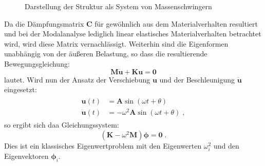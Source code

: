 \documentclass[letterpaper,10pt,german]{jupyterBook}
\let\sphinxpxdimen\pdfpxdimen\else\newdimen\sphinxpxdimen
\begin{document}
\begin{figure}[htbp]
\centering
\capstart

\noindent\sphinxincludegraphics[width=500\sphinxpxdimen]{{Modal_Ansys_01}.png}
\caption{Darstellung der Struktur als System von Massenschwingern }\label{\detokenize{chapters/chapter6/Modalanalyse:modalansys01}}\end{figure}

\sphinxAtStartPar
Da die Dämpfungsmatrix \(\mathbf{C}\) für gewöhnlich aus dem Materialverhalten resultiert und bei der Modalanalyse lediglich linear elastisches Materialverhalten betrachtet wird, wird diese Matrix   vernachlässigt. Weiterhin sind die Eigenformen unabhängig von der äußeren Belastung, so dass die resultierende Bewegungsgleichung:
\label{equation:chapters/chapter6/Modalanalyse:acb03aee-8ea8-4cf6-8dad-f894d0eed7ea}\begin{equation}
\bm{M}\ddot{\bm{u}} + \bm{K}\bm{u} = \bm{0}
\end{equation}
\sphinxAtStartPar
lautet. Wird nun der Ansatz der Verschiebung \(\bm{u}\) und der Beschleunigung \(\ddot{\bm{u}}\) eingesetzt:
\begin{equation}\label{equation:chapters/chapter6/Modalanalyse:FEMLinearDynamics}
\begin{split}\begin{align}
 \bm{u}(t) & = \bm{A} \sin\left(\omega t + \theta\right) \\
 \ddot{\bm{u}}(t) & = -\omega^2 \bm{A} \sin\left(\omega t + \theta\right) \; ,
\end{align}\end{split}
\end{equation}
\sphinxAtStartPar
so ergibt sich daa Gleichungssystem:
\label{equation:chapters/chapter6/Modalanalyse:757f4976-e9fc-49e3-ad1b-356668770916}\begin{equation}
\left( \bm{K} - \omega^2 \bm{M} \right) \bm{\phi} = \bm{0} \; .
\end{equation}
\sphinxAtStartPar
Dies ist ein klassisches Eigenwertproblem mit den Eigenwerten \(\omega_i^2\) und den Eigenvektoren \(\bm{\phi}_i\).
\end{document}
